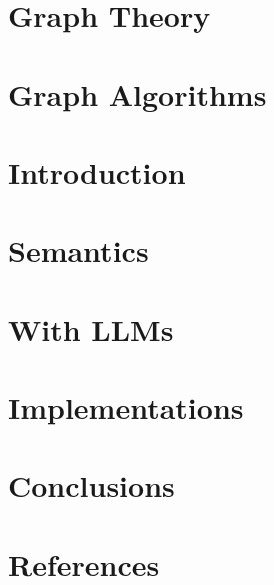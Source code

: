 \section[Theory]{Graph Theory}


\section[Algos]{Graph Algorithms}


\section[Intro]{Introduction}


\section[Sem]{Semantics}


\section[LLMs]{With LLMs}





\section[Impl]{Implementations}


\section[Conclusions]{Conclusions}


\section[Refs]{References}
